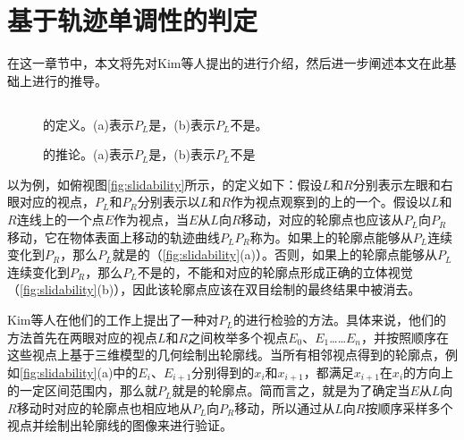 \chapter{基于轨迹单调性的\epsl{}判定}

在这一章节中，本文将先对Kim等人提出的\epsl{}\cite{kim2013stereoscopic}进行介绍，然后进一步阐述本文在此基础上进行的推导。

\section{\epsl{}}

\begin{figure}[tbh]
    \centering
    \hfil
    \caption[\epsl{}的定义]{\epsl{}的定义。(a)表示$P_L$是\epslb{}，(b)表示$P_L$不是\epslb{}。} \label{fig_sim2}
    \label{fig:slidability}
\end{figure}

\begin{figure}[tbh]
    \centering
    \hfil
    \caption[\epsl{}的推论]{\epsl{}的推论。(a)表示$P_L$是\epslb{}，(b)表示$P_L$不是\epslb{}} \label{fig:inverse_slidability}
\end{figure}

以\con{}为例，如俯视图\autoref{fig:slidability}所示，\epsl{}的定义如下：假设$L$和$R$分别表示左眼和右眼对应的视点，$P_L$和$P_R$分别表示以$L$和$R$作为视点观察到的\con{}上的一个\conp{}。假设以$L$和$R$连线上的一个点$E$作为视点，当$E$从$L$向$R$移动，对应的轮廓点也应该从$P_L$向$P_R$移动，它在物体表面上移动的轨迹曲线${P_L}{P_R}$称为\ec{}\cite{geiger1995occlusions}。如果\ec{}上的轮廓点能够从$P_L$连续变化到$P_R$，那么$P_L$就是\epslb{}的（\autoref{fig:slidability}(a)）。否则，如果\ec{}上的轮廓点能够从$P_L$连续变化到$P_R$，那么$P_L$不是\epslb{}的，不能和对应的轮廓点形成正确的立体视觉（\autoref{fig:slidability}(b)），因此该轮廓点应该在双目绘制的最终结果中被消去。
 
Kim等人在他们的工作上提出了一种对$P_L$的\epsl{}进行检验的方法。具体来说，他们的方法首先在两眼对应的视点$L$和$R$之间枚举多个视点$E_0$、$E_1$……$E_n$，并按照顺序在这些视点上基于三维模型的几何绘制出轮廓线。当所有相邻视点得到的轮廓点，例如\autoref{fig:slidability}(a)中的$E_i$、$E_{i+1}$分别得到的$x_i$和$x_{i+1}$，都满足$x_{i+1}$在$x_i$的\ec{}方向上的一定区间范围内，那么就$P_L$就是\epslb{}的轮廓点。简而言之，就是为了确定当$E$从$L$向$R$移动时对应的轮廓点也相应地从$P_L$向$P_R$移动，所以通过从$L$向$R$按顺序采样多个视点并绘制出轮廓线的图像来进行验证。

